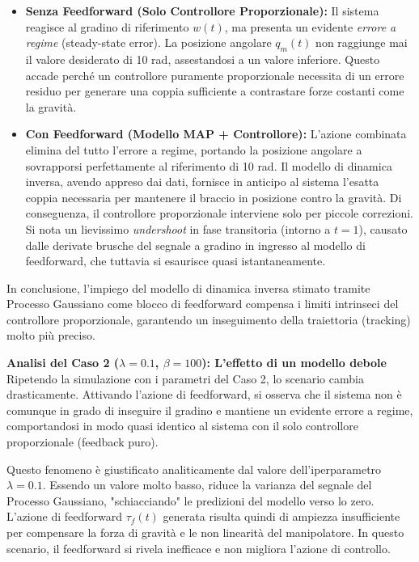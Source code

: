 \documentclass[a4paper,12pt]{article}
\begin{document}
\begin{itemize}
    \item \textbf{Senza Feedforward (Solo Controllore Proporzionale):} Il sistema reagisce al gradino di riferimento $w(t)$, ma presenta un evidente \textit{errore a regime} (steady-state error). La posizione angolare $q_m(t)$ non raggiunge mai il valore desiderato di 10 rad, assestandosi a un valore inferiore. Questo accade perché un controllore puramente proporzionale necessita di un errore residuo per generare una coppia sufficiente a contrastare forze costanti come la gravità.
    
    \item \textbf{Con Feedforward (Modello MAP + Controllore):} L'azione combinata elimina del tutto l'errore a regime, portando la posizione angolare a sovrapporsi perfettamente al riferimento di 10 rad. Il modello di dinamica inversa, avendo appreso dai dati, fornisce in anticipo al sistema l'esatta coppia necessaria per mantenere il braccio in posizione contro la gravità. Di conseguenza, il controllore proporzionale interviene solo per piccole correzioni. Si nota un lievissimo \textit{undershoot} in fase transitoria (intorno a $t=1$), causato dalle derivate brusche del segnale a gradino in ingresso al modello di feedforward, che tuttavia si esaurisce quasi istantaneamente.
\end{itemize}

In conclusione, l'impiego del modello di dinamica inversa stimato tramite Processo Gaussiano come blocco di feedforward compensa i limiti intrinseci del controllore proporzionale, garantendo un inseguimento della traiettoria (tracking) molto più preciso.

\vspace{0.5cm}
\textbf{Analisi del Caso 2 ($\lambda=0.1$, $\beta=100$): L'effetto di un modello debole} \\
Ripetendo la simulazione con i parametri del Caso 2, lo scenario cambia drasticamente. Attivando l'azione di feedforward, si osserva che il sistema non è comunque in grado di inseguire il gradino e mantiene un evidente errore a regime, comportandosi in modo quasi identico al sistema con il solo controllore proporzionale (feedback puro).

Questo fenomeno è giustificato analiticamente dal valore dell'iperparametro $\lambda=0.1$. Essendo un valore molto basso, riduce la varianza del segnale del Processo Gaussiano, "schiacciando" le predizioni del modello verso lo zero. L'azione di feedforward $\tau_f(t)$ generata risulta quindi di ampiezza insufficiente per compensare la forza di gravità e le non linearità del manipolatore. In questo scenario, il feedforward si rivela inefficace e non migliora l'azione di controllo.
\end{document}
